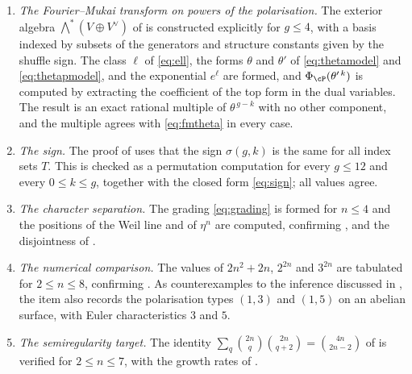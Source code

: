 \begin{enumerate}[label=\textup{(\Roman*)},leftmargin=*]
\item \emph{The Fourier--Mukai transform on powers of the polarisation.}
  The exterior algebra $\bigwedge^{*}(V\oplus V^{\vee})$ of
   is constructed explicitly for $g\le4$, with a basis
  indexed by subsets of the generators and structure constants given by the
  shuffle sign. The class $\ell$ of \eqref{eq:ell}, the forms $\theta$ and
  $\theta'$ of \eqref{eq:thetamodel} and \eqref{eq:thetapmodel}, and the
  exponential $e^{\ell}$ are formed, and $\Phi_{\cP}(\theta'^{\,k})$ is
  computed by extracting the coefficient of the top form in the dual
  variables. The result is an exact rational multiple of $\theta^{\,g-k}$
  with no other component, and the multiple agrees with \eqref{eq:fmtheta} in
  every case.

\item \emph{The sign.} The proof of  uses that the sign
  $\sigma(g,k)$ is the same for all index sets $T$. This is checked as a
  permutation computation for every $g\le12$ and every $0\le k\le g$,
  together with the closed form \eqref{eq:sign}; all values agree.

\item \emph{The character separation.} The grading \eqref{eq:grading} is
  formed for $n\le4$ and the positions of the Weil line and of $\eta^{n}$ are
  computed, confirming ,  and the
  disjointness of .

\item \emph{The numerical comparison.} The values of $2n^{2}+2n$, $2^{2n}$
  and $3^{2n}$ are tabulated for $2\le n\le8$, confirming
  . As counterexamples to the inference discussed in
  , the item also records the polarisation types $(1,3)$
  and $(1,5)$ on an abelian surface, with Euler characteristics $3$ and $5$.

\item \emph{The semiregularity target.} The identity
  $\sum_{q}\binom{2n}{q}\binom{2n}{q+2}=\binom{4n}{2n-2}$ of
   is verified for $2\le n\le7$, with the growth rates of
  .


\end{enumerate}
